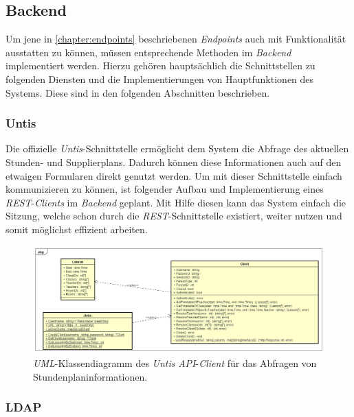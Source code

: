 \subsection{Backend}
Um jene in  \autoref{chapter:endpoints} beschriebenen \textit{Endpoints} auch mit Funktionalität ausstatten zu können, müssen entsprechende Methoden im \textit{Backend} implementiert werden. Hierzu gehören hauptsächlich die Schnittstellen zu folgenden Diensten und die Implementierungen von Hauptfunktionen des Systems. Diese sind in den folgenden Abschnitten beschrieben.

\subsubsection{Untis}

Die offizielle \textit{Untis}-Schnittstelle ermöglicht dem System die Abfrage des aktuellen Stunden- und Supplierplans. Dadurch können diese Informationen auch auf den etwaigen Formularen direkt genutzt werden. Um mit dieser Schnittstelle einfach kommunizieren zu können, ist folgender Aufbau und Implementierung eines \textit{REST}-\textit{Clients} im \textit{Backend} geplant. Mit Hilfe diesen kann das System einfach die Sitzung, welche schon durch die \textit{REST}-Schnittstelle existiert, weiter nutzen und somit möglichst effizient arbeiten.

\begin{figure}[H]
	\centering
	\includegraphics[width=\linewidth]{images/mbeier_konzept/Untis}
	\caption[\textit{Untis} \textit{API}-\textit{Client} \textit{UML}-Klassendiagramm]{\textit{UML}-Klassendiagramm des \textit{Untis} \textit{API}-\textit{Client} für das Abfragen von Stundenplaninformationen.}
	\label{fig:untis}
\end{figure}

\newpage

\subsubsection{LDAP}

